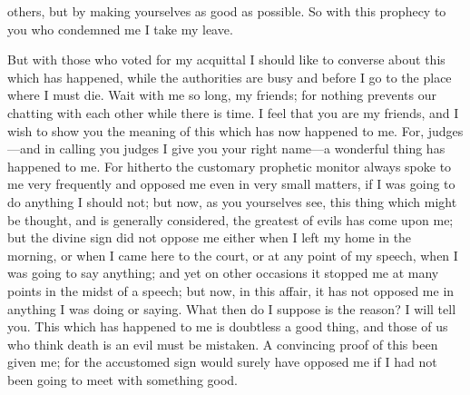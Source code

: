 \documentclass[letterpaper,12pt]{article}
\newcommand{\stephpag}[1]{\marginnote{\small\itshape\fontfamily{ppl}\selectfont #1}}
\begin{document}
others, but by making yourselves as good as possible. So with this prophecy to you who condemned me \stephpag{e} I take my leave.

But with those who voted for my acquittal I should like to converse about this which has happened, while the authorities are busy and before I go to the place where I must die. Wait with me so long, my friends; for nothing prevents our chatting with each other \stephpag{40 a} while there is time. I feel that you are my friends, and I wish to show you the meaning of this which has now happened to me. For, judges---and in calling you judges I give you your right name---a wonderful thing has happened to me. For hitherto the customary prophetic monitor always spoke to me very frequently and opposed me even in very small matters, if I was going to do anything I should not; but now, as you yourselves see, this thing which might be thought, and is generally considered, the greatest of evils has come upon me; but the divine sign did not oppose me \stephpag{b} either when I left my home in the morning, or when I came here to the court, or at any point of my speech, when I was going to say anything; and yet on other occasions it stopped me at many points in the midst of a speech; but now, in this affair, it has not opposed me in anything I was doing or saying. What then do I suppose is the reason? I will tell you. This which has happened to me is doubtless a good thing, and those of us who think death is an evil \stephpag{c} must be mistaken. A convincing proof of this been given me; for the accustomed sign would surely have opposed me if I had not been going to meet with something good.
\end{document}
